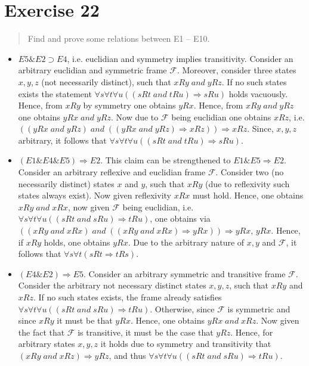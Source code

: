\documentclass[11pt,a4paper]{article}
\newcommand{\lto}{\supset}
\newcommand{\sand}{\; and \;}
\newcommand{\sto}{\Rightarrow}
\begin{document}
\section*{Exercise 22}
\begin{quote}
Find and prove some relations between E1 – E10.
\end{quote}
\begin{itemize}
\item $E5 \& E2 \lto E4$, i.e. euclidian and symmetry implies transitivity. Consider an arbitrary euclidian and symmetric frame $\mathcal{F}$. Moreover, consider three states $x,y,z$ (not necessarily distinct), such that $xRy \sand yRz$. If no such states exists the statement $\forall s \forall t \forall u ((sRt \sand tRu) \sto sRu)$ holds vacuously. Hence, from $xRy$ by symmetry one obtains $yRx$. Hence, from $xRy \sand yRz$ one obtains $yRx \sand yRz$. Now due to $\mathcal{F}$ being euclidian one obtains $xRz$, i.e. $((yRx \sand yRz) \sand ((yRx \sand yRz) \sto xRz)) \sto xRz$. Since, $x,y,z$ arbitrary, it follows that $\forall s \forall t \forall u ((sRt \sand tRu) \sto sRu)$.
 
\item $(E1 \& E4 \& E5) \sto E2$. This claim can be strengthened to $E1 \& E5 \sto E2$. Consider an arbitrary reflexive and euclidian frame $\mathcal{F}$. Consider two (no necessarily distinct) states $x$ and $y$, such that $xRy$ (due to reflexivity such states always exist). Now given reflexivity $xRx$ must hold. Hence, one obtains $xRy \sand xRx$, now given $\mathcal{F}$ being euclidian, i.e.$\forall s \forall t \forall u ((sRt \sand sRu) \sto tRu)$, one obtains via $((xRy \sand xRx) \sand ((xRy \sand xRx) \sto yRx)) \sto yRx$, $yRx$. Hence, if $xRy$ holds, one obtains $yRx$. Due to the arbitrary nature of $x,y$ and $\mathcal{F}$, it follows that $\forall s \forall t (sRt \sto tRs)$.

\item $(E4 \& E2) \sto E5$. Consider an arbitrary symmetric and transitive frame $\mathcal{F}$. Consider the arbitrary not necessary distinct states $x,y,z$, such that $xRy$ and $xRz$. If no such states exists, the frame already satisfies $\forall s \forall t \forall u ((sRt \sand sRu) \sto tRu)$. Otherwise, since $\mathcal{F}$ is symmetric and since $xRy$ it must be that $yRx$. Hence, one obtains $yRx \sand xRz$. Now given the fact that $\mathcal{F}$ is transitive, it must be the case that $yRz$. Hence, for arbitrary states $x,y,z$ it holds due to symmetry and transitivity that $(xRy \sand xRz)\sto yRz$, and thus $\forall s \forall t \forall u ((sRt \sand sRu) \sto tRu)$. 


\end{itemize}
\end{document}
